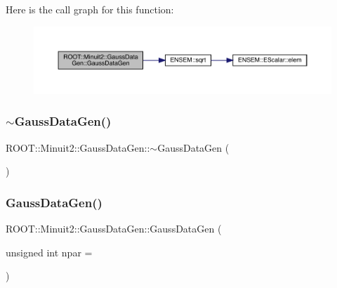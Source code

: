 Here is the call graph for this function\+:
\nopagebreak
\begin{figure}[H]
\begin{center}
\leavevmode
\includegraphics[width=350pt]{d8/d75/classROOT_1_1Minuit2_1_1GaussDataGen_a9d4852a18f8d4f261ea60f5b2abeee4d_cgraph}
\end{center}
\end{figure}
\mbox{\label{classROOT_1_1Minuit2_1_1GaussDataGen_ab35aa0205949603dbe8731c6d47e79f0}} 
\subsubsection{\texorpdfstring{$\sim$GaussDataGen()}{~GaussDataGen()}\hspace{0.1cm}{\footnotesize\ttfamily [1/2]}}
{\footnotesize\ttfamily R\+O\+O\+T\+::\+Minuit2\+::\+Gauss\+Data\+Gen\+::$\sim$\+Gauss\+Data\+Gen (\begin{DoxyParamCaption}{ }\end{DoxyParamCaption})\hspace{0.3cm}{\ttfamily [inline]}}

\mbox{\label{classROOT_1_1Minuit2_1_1GaussDataGen_a9d4852a18f8d4f261ea60f5b2abeee4d}} 
\subsubsection{\texorpdfstring{GaussDataGen()}{GaussDataGen()}\hspace{0.1cm}{\footnotesize\ttfamily [2/2]}}
{\footnotesize\ttfamily R\+O\+O\+T\+::\+Minuit2\+::\+Gauss\+Data\+Gen\+::\+Gauss\+Data\+Gen (\begin{DoxyParamCaption}\item[{unsigned int}]{npar = {} }\end{DoxyParamCaption})}

